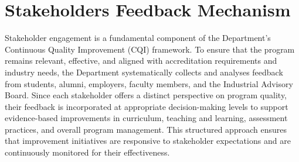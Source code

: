 \hypertarget{Stakeholders Feedback Mechanism}{%
\section{Stakeholders Feedback Mechanism}\label{Stakeholders-Feedback-Mechanism}}

Stakeholder engagement is a fundamental component of the Department's Continuous Quality Improvement (CQI) framework. To ensure that the program remains relevant, effective, and aligned with accreditation requirements and industry needs, the Department systematically collects and analyses feedback from students, alumni, employers, faculty members, and the Industrial Advisory Board. Since each stakeholder offers a distinct perspective on program quality, their feedback is incorporated at appropriate decision-making levels to support evidence-based improvements in curriculum, teaching and learning, assessment practices, and overall program management. This structured approach ensures that improvement initiatives are responsive to stakeholder expectations and are continuously monitored for their effectiveness.


